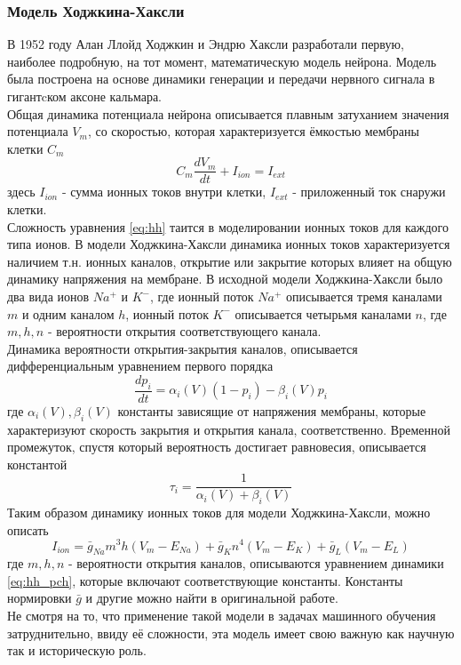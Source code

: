 \documentclass[a4paper,10pt]{article}
\begin{document}
\subsubsection{Модель Ходжкина-Хаксли}
	В 1952 году Алан Ллойд Ходжкин и Эндрю Хаксли разработали первую, наиболее подробную, на тот момент, математическую модель нейрона. Модель была построена на основе динамики генерации и передачи нервного сигнала в гигантcком аксоне кальмара.\\
	\indent Общая динамика потенциала нейрона описывается плавным затуханием значения потенциала $V_{m}$, со скоростью, которая характеризуется ёмкостью мембраны клетки $C_{m}$
	\begin{equation}\label{eq:hh}
	C_{m}\frac{dV_{m}}{dt}+I_{ion}=I_{ext}
	\end{equation}	 
	здесь $I_{ion}$ - сумма ионных токов внутри клетки, $I_{ext}$ - приложенный ток снаружи клетки.\\
	\indent Сложность уравнения \ref{eq:hh} таится в моделировании ионных токов для каждого типа ионов. В модели Ходжкина-Хаксли динамика ионных токов характеризуется наличием т.н. ионных каналов, открытие или закрытие которых влияет на общую динамику напряжения на мембране. В исходной модели Ходжкина-Хаксли было два вида ионов $Na^{+}$ и $K^{-}$, где ионный поток $Na^{+}$ описывается тремя каналами $m$ и одним каналом $h$, ионный поток $K^{-}$ описывается четырьмя каналами $n$, где $m, h, n$ - вероятности открытия соответствующего канала\cite{Genesis}.\\ 
	\indent Динамика вероятности открытия-закрытия каналов, описывается дифференциальным уравнением первого порядка
	\begin{equation}\label{eq:hh_pch}
	\frac{dp_{i}}{dt} = \alpha_{i}(V)(1-p_{i}) - \beta_{i}(V)p_{i}
	\end{equation}	 
	где $\alpha_{i}(V), \beta_{i}(V)$ константы зависящие от напряжения мембраны, которые характеризуют скорость закрытия и открытия канала, соответственно. Временной промежуток, спустя который вероятность достигает равновесия, описывается константой
	\begin{equation}\label{eq:hh_t}
	\tau_{i}=\frac{1}{\alpha_{i}(V)+\beta_{i}(V)}	
	\end{equation}
	\indent Таким образом динамику ионных токов для модели Ходжкина-Хаксли, можно описать
	\begin{equation}\label{eq:hh_ion}
	I_{ion} = \bar{g}_{Na}m^{3}h(V_{m}-E_{Na}) + \bar{g}_{K}n^{4}(V_{m}-E_{K})+\bar{g}_{L}(V_{m}-E_{L})
	\end{equation}	
	где $m, h, n$ - вероятности открытия каналов, описываются уравнением динамики \ref{eq:hh_pch}, которые включают соответствующие константы. Константы нормировки $\bar{g}$ и другие можно найти в оригинальной работе\cite{HH}.\\
	\indent Не смотря на то, что применение такой модели в задачах машинного обучения затруднительно, ввиду её сложности, эта модель имеет свою важную как  научную так и историческую роль.
\end{document}
